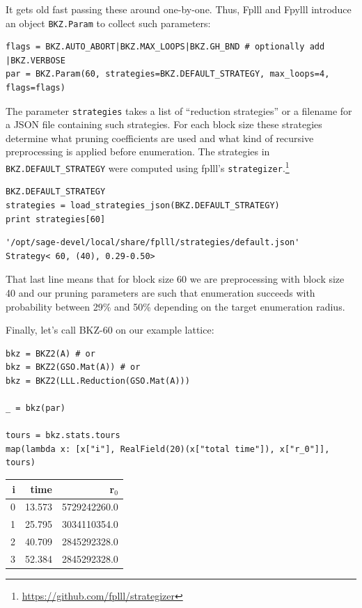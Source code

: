 \documentclass[10pt,a4paper,nobib]{tufte-handout}
\begin{document}
It gets old fast passing these around one-by-one. Thus, Fplll and Fpylll introduce an object \texttt{BKZ.Param} to collect such parameters:

\lstset{language=sage,label= ,caption= ,captionpos=b,numbers=none}
\begin{lstlisting}
flags = BKZ.AUTO_ABORT|BKZ.MAX_LOOPS|BKZ.GH_BND # optionally add |BKZ.VERBOSE
par = BKZ.Param(60, strategies=BKZ.DEFAULT_STRATEGY, max_loops=4, flags=flags)
\end{lstlisting}

The parameter \texttt{strategies} takes a list of “reduction strategies” or a filename for a JSON file containing such strategies. For each block size these strategies determine what pruning coefficients are used and what kind of recursive preprocessing is applied before enumeration. The strategies in \texttt{BKZ.DEFAULT\_STRATEGY} were computed using fplll’s \texttt{strategizer}.\footnote{\url{https://github.com/fplll/strategizer}}

\lstset{language=sage,label= ,caption= ,captionpos=b,numbers=none}
\begin{lstlisting}
BKZ.DEFAULT_STRATEGY
strategies = load_strategies_json(BKZ.DEFAULT_STRATEGY)
print strategies[60]
\end{lstlisting}

\begin{verbatim}
'/opt/sage-devel/local/share/fplll/strategies/default.json'
Strategy< 60, (40), 0.29-0.50>
\end{verbatim}

That last line means that for block size 60 we are preprocessing with block size 40 and our pruning parameters are such that enumeration succeeds with probability between 29\% and 50\% depending on the target enumeration radius.

Finally, let’s call BKZ-60 on our example lattice:

\lstset{language=sage,label= ,caption= ,captionpos=b,numbers=none}
\begin{lstlisting}
bkz = BKZ2(A) # or
bkz = BKZ2(GSO.Mat(A)) # or 
bkz = BKZ2(LLL.Reduction(GSO.Mat(A)))

_ = bkz(par)

tours = bkz.stats.tours
map(lambda x: [x["i"], RealField(20)(x["total time"]), x["r_0"]], tours)
\end{lstlisting}

\begin{center}
\begin{tabular}{rrr}
i & time & r\(_{\text{0}}\)\\
\hline
0 & 13.573 & 5729242260.0\\
1 & 25.795 & 3034110354.0\\
2 & 40.709 & 2845292328.0\\
3 & 52.384 & 2845292328.0\\
\end{tabular}

\end{center}
\end{document}
